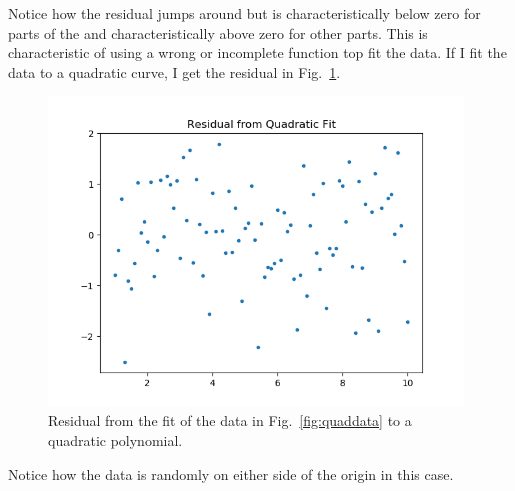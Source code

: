 \documentclass{scrartcl}
\begin{document}
Notice how the residual jumps around but is characteristically below
zero for parts of the and characteristically above zero for other
parts. This is characteristic of using a wrong or incomplete function
top fit the data. If I fit the data to a quadratic curve,
I get the residual in Fig.~\ref{fig:quadfit}.
\begin{figure}
\begin{center}
\includegraphics[width=11cm]{quadfit}
\end{center}
\caption{\label{fig:quadfit}Residual from the fit of the
data in Fig.~\ref{fig:quaddata} to a quadratic polynomial.}
\end{figure}
Notice how the data is randomly on either side of the origin
in this case.
\end{document}
